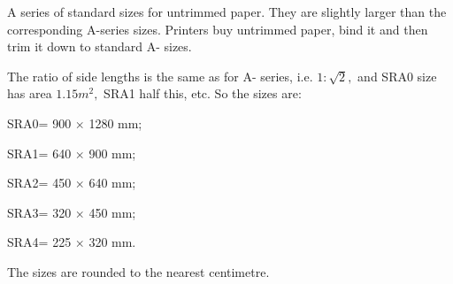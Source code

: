 A series of standard sizes for untrimmed paper. They are slightly larger than 
the corresponding A-series sizes. Printers buy untrimmed paper, bind it and
then trim it down to standard A- sizes.
\par
The ratio of side lengths is the same as for A- series, i.e. $ 1 : \sqrt{2} , $
and SRA0 size has area $1.15m^{2},$  SRA1 half this, etc. So the sizes are:
\par
SRA0= 900 \ensuremath{ \times } 1280  mm;
\par
SRA1= 640 \ensuremath{ \times } 900  mm;
\par
SRA2= 450 \ensuremath{ \times } 640  mm;
\par
SRA3= 320 \ensuremath{ \times } 450 mm;
\par
SRA4= 225 \ensuremath{ \times } 320 mm.
\par
The sizes are rounded to the nearest centimetre.